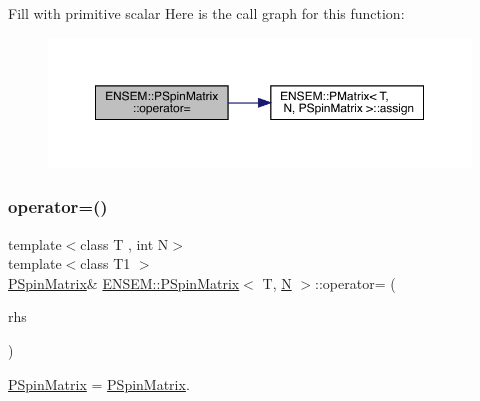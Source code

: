 Fill with primitive scalar Here is the call graph for this function\+:
\nopagebreak
\begin{figure}[H]
\begin{center}
\leavevmode
\includegraphics[width=350pt]{d0/d1e/classENSEM_1_1PSpinMatrix_a0b0ca395b4662cc2f1a18724aa8354e4_cgraph}
\end{center}
\end{figure}
\mbox{\label{classENSEM_1_1PSpinMatrix_a0346425dd32cab35d2f76c9d5cca8533}} 
\subsubsection{\texorpdfstring{operator=()}{operator=()}\hspace{0.1cm}{\footnotesize\ttfamily [5/6]}}
{\footnotesize\ttfamily template$<$class T , int N$>$ \\
template$<$class T1 $>$ \\
\mbox{\hyperlink{classENSEM_1_1PSpinMatrix}{P\+Spin\+Matrix}}\& \mbox{\hyperlink{classENSEM_1_1PSpinMatrix}{E\+N\+S\+E\+M\+::\+P\+Spin\+Matrix}}$<$ T, \mbox{\hyperlink{operator__name__util_8cc_a7722c8ecbb62d99aee7ce68b1752f337}{N}} $>$\+::operator= (\begin{DoxyParamCaption}\item[{const \mbox{\hyperlink{classENSEM_1_1PSpinMatrix}{P\+Spin\+Matrix}}$<$ T1, \mbox{\hyperlink{operator__name__util_8cc_a7722c8ecbb62d99aee7ce68b1752f337}{N}} $>$ \&}]{rhs }\end{DoxyParamCaption})\hspace{0.3cm}{\ttfamily [inline]}}



\mbox{\hyperlink{classENSEM_1_1PSpinMatrix}{P\+Spin\+Matrix}} = \mbox{\hyperlink{classENSEM_1_1PSpinMatrix}{P\+Spin\+Matrix}}. 

